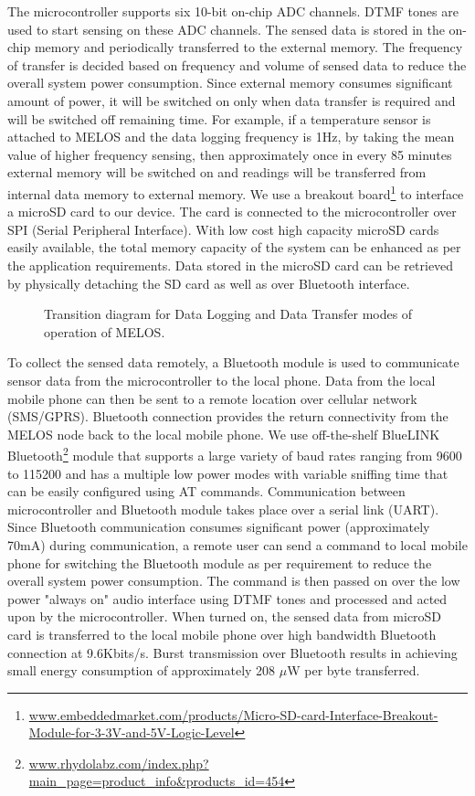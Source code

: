 \documentclass[10pt]{sigplan-proc-varsize}
\newcommand{\melos}{MELOS }
\newcommand{\melosnospace}{MELOS}
\begin{document}
The microcontroller supports six 10-bit on-chip ADC channels. DTMF tones are used to start sensing on these ADC channels. The sensed data is stored in the on-chip memory and periodically transferred to the external memory. The frequency of transfer is decided based on frequency and volume of sensed data to reduce the overall system power consumption. Since external memory consumes significant amount of power, it will be switched on only when data transfer is required and will be switched off remaining time. For example, if a temperature sensor is attached to \melos and the data logging frequency is 1Hz, by taking the mean value of higher frequency sensing, then approximately once in every 85 minutes external memory will be switched on and readings will be transferred from internal data memory to external memory.  We use a breakout board\footnote{\url{www.embeddedmarket.com/products/Micro-SD-card-Interface-Breakout-Module-for-3-3V-and-5V-Logic-Level}} to interface a microSD card to our device. The card is connected to the microcontroller over SPI (Serial Peripheral Interface). With low cost high capacity microSD cards easily available, the total memory capacity of the system can be enhanced as per the application requirements. Data stored in the microSD card can be retrieved by physically detaching the SD card as well as over Bluetooth interface. 

\begin{figure}
\centering
{}
\caption{Transition diagram for Data Logging and Data Transfer modes of operation of \melosnospace.}
\label{fig:statetransition}
\vspace{-5mm}
\end{figure}


To collect the sensed data remotely, a Bluetooth module is used to communicate sensor data from the microcontroller to the local phone. Data from the local mobile phone can then be sent to a remote location over cellular network (SMS/GPRS). Bluetooth connection provides the return connectivity from the \melos node back to the local mobile phone. We use off-the-shelf BlueLINK Bluetooth\footnote{\url{www.rhydolabz.com/index.php?main_page=product_info&products_id=454}} module that supports a large variety of baud rates ranging from 9600 to 115200 and has a multiple low power modes with variable sniffing time that can be easily configured using AT commands. Communication between microcontroller and Bluetooth module takes place over a serial link (UART). Since Bluetooth communication consumes significant power (approximately 70mA) during communication, a remote user can send a command to local mobile phone for switching the Bluetooth module as per requirement to reduce the overall system power consumption. The command is then passed on over the low power "always on" audio interface using DTMF tones and processed and acted upon by the microcontroller. When turned on, the sensed data from microSD card is transferred to the local mobile phone over high bandwidth Bluetooth connection at 9.6Kbits/s. Burst transmission over Bluetooth results in achieving small energy consumption of approximately 208 $\mu$W per byte transferred.
\end{document}

